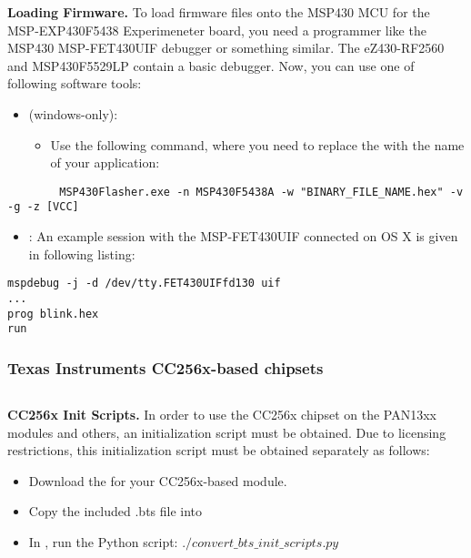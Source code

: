 \textbf{Loading Firmware.} To load firmware files onto the MSP430 MCU for the MSP-EXP430F5438 Experimeneter board, you need a programmer like the MSP430 MSP-FET430UIF debugger or something similar. The eZ430-RF2560 and MSP430F5529LP contain a basic debugger. Now, you can use one of following software tools:

 \begin{itemize}
 \item  \MSPFlasher{} (windows-only):
 	\begin{itemize}
 	   \item Use the following command, where you need to replace the  with the name of your application:
	\end{itemize} 
\end{itemize}
	
	   \begin{lstlisting}
 		MSP430Flasher.exe -n MSP430F5438A -w "BINARY_FILE_NAME.hex" -v -g -z [VCC]
	   \end{lstlisting}

 \begin{itemize}
	
	\item \MSPDebug{}: An example session with the MSP-FET430UIF connected on OS X is given in following listing:
\end{itemize}

\begin{lstlisting}
mspdebug -j -d /dev/tty.FET430UIFfd130 uif
... 
prog blink.hex
run
\end{lstlisting}

\subsubsection{Texas Instruments CC256x-based chipsets}
$ $

 \textbf{CC256x Init Scripts.} In order to use the CC256x chipset on the PAN13xx modules and others, an initialization script must be obtained. Due to licensing restrictions, this initialization script must be obtained separately as follows:
\begin{itemize}
\item Download the \BTSfile{} for your CC256x-based module.
\item Copy the included .bts file into 
\item In , run the Python script: $./convert\_bts\_init\_scripts.py$
\end{itemize}

